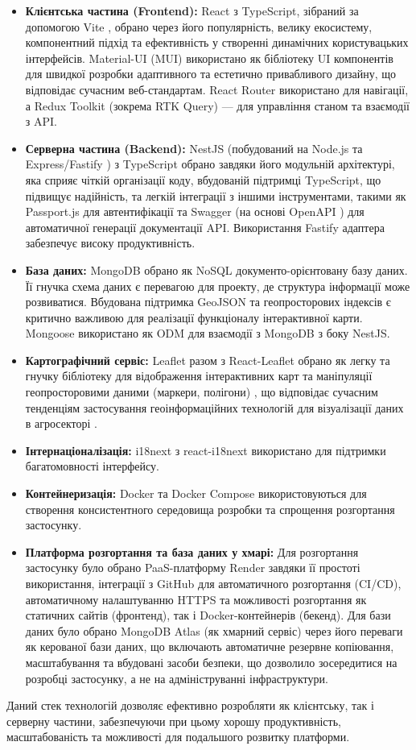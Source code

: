 \begin{itemize}
    \item \textbf{Клієнтська частина (Frontend):} React \cite{react} з TypeScript, зібраний за допомогою Vite \cite{vite}, обрано через його популярність, велику екосистему, компонентний підхід та ефективність у створенні динамічних користувацьких інтерфейсів. Material-UI (MUI) \cite{materialui} використано як бібліотеку UI компонентів для швидкої розробки адаптивного та естетично привабливого дизайну, що відповідає сучасним веб-стандартам. React Router використано для навігації, а Redux Toolkit (зокрема RTK Query) \cite{reduxtoolkit} — для управління станом та взаємодії з API.
    \item \textbf{Серверна частина (Backend):} NestJS (побудований на Node.js та Express/Fastify \cite{fastify}) з TypeScript обрано завдяки його модульній архітектурі, яка сприяє чіткій організації коду, вбудованій підтримці TypeScript, що підвищує надійність, та легкій інтеграції з іншими інструментами, такими як Passport.js \cite{passportjs} для автентифікації та Swagger (на основі OpenAPI \cite{openapi}) для автоматичної генерації документації API. Використання Fastify адаптера забезпечує високу продуктивність.
    \item \textbf{База даних:} MongoDB \cite{mongodb} обрано як NoSQL документо-орієнтовану базу даних. Її гнучка схема даних є перевагою для проекту, де структура інформації може розвиватися. Вбудована підтримка GeoJSON та геопросторових індексів є критично важливою для реалізації функціоналу інтерактивної карти. Mongoose \cite{mongoose} використано як ODM для взаємодії з MongoDB з боку NestJS.
    \item \textbf{Картографічний сервіс:} Leaflet разом з React-Leaflet обрано як легку та гнучку бібліотеку для відображення інтерактивних карт та маніпуляції геопросторовими даними (маркери, полігони) \cite{leaflet}, що відповідає сучасним тенденціям застосування геоінформаційних технологій для візуалізації даних в агросекторі \cite{granell2015agrogeoinformatics}.
    \item \textbf{Інтернаціоналізація:} i18next \cite{i18next} з react-i18next використано для підтримки багатомовності інтерфейсу.
    \item \textbf{Контейнеризація:} Docker \cite{docker} та Docker Compose використовуються для створення консистентного середовища розробки та спрощення розгортання застосунку.
    \item \textbf{Платформа розгортання та база даних у хмарі:} Для розгортання застосунку було обрано PaaS-платформу Render \cite{renderpaas} завдяки її простоті використання, інтеграції з GitHub для автоматичного розгортання (CI/CD), автоматичному налаштуванню HTTPS та можливості розгортання як статичних сайтів (фронтенд), так і Docker-контейнерів (бекенд). Для бази даних було обрано MongoDB Atlas \cite{mongodb} (як хмарний сервіс) через його переваги як керованої бази даних, що включають автоматичне резервне копіювання, масштабування та вбудовані засоби безпеки, що дозволило зосередитися на розробці застосунку, а не на адмініструванні інфраструктури.
\end{itemize}
Даний стек технологій дозволяє ефективно розробляти як клієнтську, так і серверну частини, забезпечуючи при цьому хорошу продуктивність, масштабованість та можливості для подальшого розвитку платформи. 